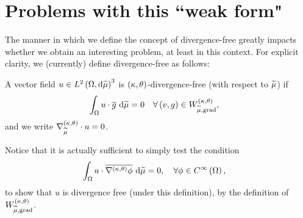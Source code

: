 \documentclass[11pt]{report}
\begin{document}
\section*{Problems with this ``weak form"}
The manner in which we define the concept of divergence-free greatly impacts whether we obtain an interesting problem, at least in this context.
For explicit clarity, we (currently) define divergence-free as follows:
\begin{definition}
	A vector field $u\in L^{2}\left( \Omega,\mathrm{d}\widetilde{\mu} \right)^3$ is $\left( \kappa, \theta \right)$-divergence-free (with respect to $\widetilde{\mu}$) if
	\begin{align*}
		\int_{\Omega} u\cdot\overline{g}  \ \mathrm{d}\widetilde{\mu} &=0 \quad\forall\left( v,g \right)\in W^{\left( \kappa, \theta \right)}_{\widetilde{\mu}, \mathrm{grad}},
	\end{align*}
	and we write $\nabla^{\left( \kappa, \theta \right)}_{\widetilde{\mu}}\cdot u = 0$.
\end{definition}
Notice that it is actually sufficient to simply test the condition
\begin{align*}
	\int_{\Omega} u\cdot\overline{\nabla^{\left( \kappa, \theta \right)}\phi}  \ \mathrm{d}\widetilde{\mu} &=0 , \quad\forall\phi\in C^{\infty}\left( \Omega \right),
\end{align*}
to show that $u$ is divergence free (under this definition), by the definition of $W^{\left( \kappa, \theta \right)}_{\widetilde{\mu}, \mathrm{grad}}$.
\end{document}
